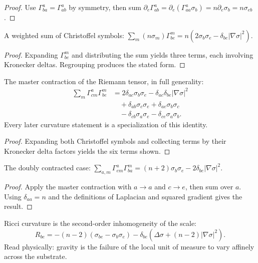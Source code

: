 \begin{proof}
Use $\Gamma^a_{ba} = \Gamma^a_{ab}$ by symmetry, then sum $\partial_e \Gamma^a_{ab} = \partial_e (\Gamma^a_{aa}\sigma_b) = n\partial_e \sigma_b = n\sigma_{eb}$.
\end{proof}

\begin{theorem}
A weighted sum of Christoffel symbols: $\sum_m (n\sigma_m) \Gamma^m_{be} = n(2\sigma_b\sigma_e - \delta_{be}|\nabla\sigma|^2)$. 
\end{theorem}

\begin{proof}
Expanding $\Gamma^m_{be}$ and distributing the sum yields three terms, each involving Kronecker deltas. Regrouping produces the stated form.
\end{proof}

\begin{theorem}
The master contraction of the Riemann tensor, in full generality:
\begin{align*}
\sum_m \Gamma^a_{cm}\Gamma^m_{be} &= 2\delta_{ac}\sigma_b\sigma_e - \delta_{ac}\delta_{be}|\nabla\sigma|^2 \\
&\quad + \delta_{ab}\sigma_c\sigma_e + \delta_{ae}\sigma_b\sigma_c \\
&\quad - \delta_{cb}\sigma_a\sigma_e - \delta_{ce}\sigma_a\sigma_b.
\end{align*}
Every later curvature statement is a specialization of this identity. 
\end{theorem}

\begin{proof}
Expanding both Christoffel symbols and collecting terms by their Kronecker delta factors yields the six terms shown.
\end{proof}

\begin{theorem}
The doubly contracted case: $\sum_{a,m} \Gamma^a_{em}\Gamma^m_{ba} = (n+2)\sigma_b\sigma_e - 2\delta_{be}|\nabla\sigma|^2$. 
\end{theorem}

\begin{proof}
Apply the master contraction with $a \to a$ and $c \to e$, then sum over $a$. Using $\delta_{aa} = n$ and the definitions of Laplacian and squared gradient gives the result.
\end{proof}

\begin{theorem}
Ricci curvature is the second-order inhomogeneity of the scale:
$$R_{be} = -(n-2)(\sigma_{be} - \sigma_b\sigma_e) - \delta_{be}(\Delta\sigma + (n-2)|\nabla\sigma|^2).$$
Read physically: gravity is the failure of the local unit of measure to vary affinely across the substrate. 
\end{theorem}

